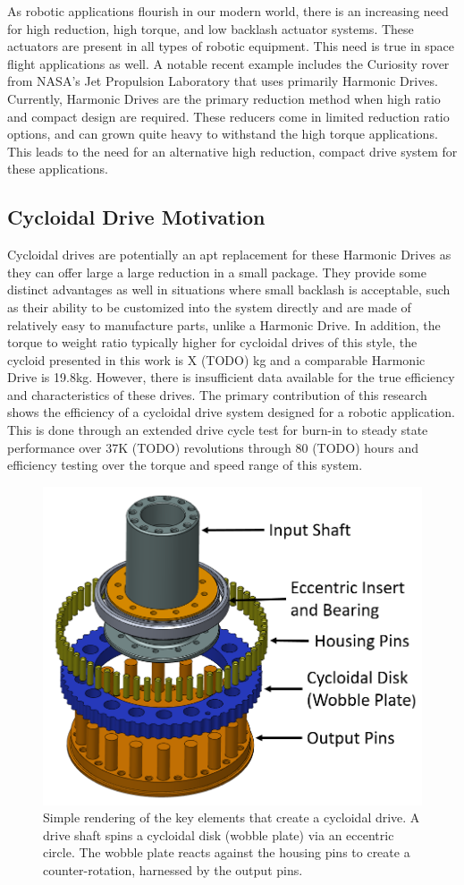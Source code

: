 
As robotic applications flourish in our modern world, there is an increasing need for  high reduction, high torque, and low backlash actuator systems. These actuators are present in all types of robotic equipment. This need is true in space flight applications as well. A notable recent example includes the Curiosity rover from NASA's Jet Propulsion Laboratory \cite{curiosity} that uses primarily Harmonic Drives. Currently, Harmonic Drives are the primary reduction method when high ratio and compact design are required. These reducers come in limited reduction ratio options, and can grown quite heavy to withstand the high torque applications. This leads to the need for an alternative high reduction, compact drive system for these applications. 

\subsection{Cycloidal Drive Motivation}

Cycloidal drives are potentially an apt replacement for these Harmonic Drives as they can offer large a large reduction in a small package. They provide some distinct advantages as well in situations where small backlash is acceptable, such as their ability to be customized into the system directly and are made of relatively easy to manufacture parts, unlike a Harmonic Drive. In addition, the torque to weight ratio typically higher for cycloidal drives of this style, the cycloid presented in this work is X (TODO) kg and a comparable Harmonic Drive is 19.8kg.
However, there is insufficient data available for the true efficiency and characteristics of these drives. The primary contribution of this research shows the efficiency of a cycloidal drive system designed for a robotic application. This is done through an extended drive cycle test for burn-in to steady state performance over 37K (TODO) revolutions through 80 (TODO) hours and efficiency testing over the torque and speed range of this system. 

   \begin{figure}[!b]
      \centering
      \includegraphics[width=0.50\linewidth]{cycloid_cartoon_v2}
      \caption{Simple rendering of the key elements that create a cycloidal drive. A drive shaft spins a cycloidal disk (wobble plate) via an eccentric circle. The wobble plate reacts against the housing pins to create a counter-rotation, harnessed by the output pins.}
      \label{cycloid_cartoon}
   \end{figure}
   
